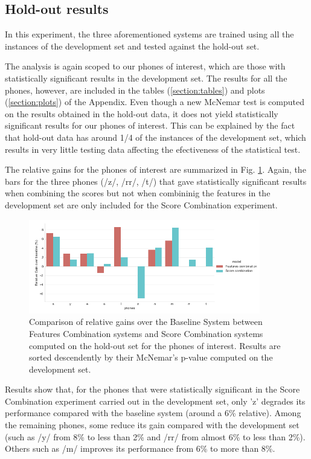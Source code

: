 \subsection{Hold-out results}

In this experiment, the three aforementioned systems are trained using all the instances of the
development set and tested against the hold-out set.

The analysis is again scoped to our phones of interest, which are those with statistically
significant results in the development set.
The results for all the phones, however, are included in the tables
(\ref{section:tables}) and plots (\ref{section:plots})
of the Appendix.
Even though a new McNemar test is computed on the
results obtained in the hold-out data, it does not yield statistically significant results
for our phones of interest. This can be explained by the fact that hold-out data
has around 1/4 of the instances of the
development set, which results in very little testing data
affecting the efectiveness of the statistical test.

The relative gains for the phones of interest are summarized in Fig. \ref{fig:fusionMcnemarTest}.
Again, the bars for the three phones (/z/, /rr/, /t/) that gave statistically significant
results when combining the scores but not when combininig the features in the development
set are only included for the Score Combination experiment.

\begin{figure}[H]
	\centering
	\includegraphics[width=0.9\textwidth]{files/figures/results/relatives/relative-fusion-systems-heldout-mcnemar.png}
	\caption{Comparison of relative gains over the Baseline System
	between Features Combination systems and Score Combination
	systems computed on the hold-out set for the phones of interest.
	Results are sorted descendently by their McNemar's p-value computed on the development set.}
	\label{fig:fusionMcnemarTest}
\end{figure}

Results show that, for the phones that were statistically significant in the Score Combination
experiment carried out in the development set, only 'z' degrades its performance compared
with the baseline system (around a 6\% relative). Among the
remaining phones, some reduce its gain compared with the development set (such as
/y/ from 8\% to less than 2\% and /rr/ from almost 6\% to less than 2\%). Others such
as /m/ improves its performance from 6\% to more than 8\%.

